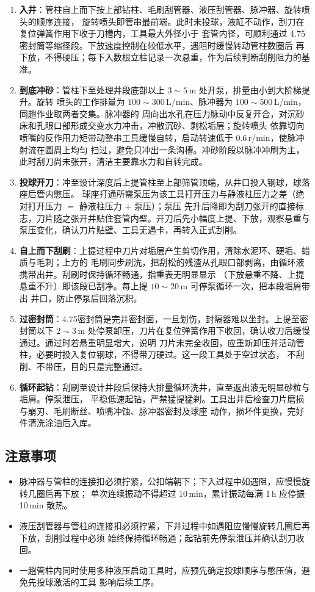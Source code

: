 \begin{enumerate}[label=(\arabic*),leftmargin=2em,itemsep=2pt]
	\item \textbf{入井}：管柱自上而下按上部钻柱、毛刷刮管器、液压刮管器、脉冲器、旋转喷头的顺序连接，
	旋转喷头即管串最前端。此时未投球，液缸不动作，刮刀在复位弹簧作用下收于刀槽内，工具最大外径小于
	套管内径，可顺利通过 4.75\inch 密封筒等缩径段。下放速度控制在较低水平，遇阻时缓慢转动管柱数圈后
	再下放，不得硬压；每下入数根立柱记录一次悬重，作为后续判断刮削阻力的基准。
	\item \textbf{到底冲砂}：管柱下至处理井段底部以上 $3\sim5$\,m 处开泵，排量由小到大阶梯提升。旋转
	喷头的工作排量为 $100\sim300$\,L/min、脉冲器为 $100\sim500$\,L/min，同趟作业取两者交集。脉冲器的
	周向出水孔在压力脉动中反复开合，对沉砂床和孔眼口部形成交变水力冲击，冲散沉砂、剥松垢层；旋转喷头
	依靠切向喷嘴的反作用力矩带动整串工具缓慢自转，启动转速低于 0.6\,r/min，使脉冲射流在圆周上均匀
	扫过，避免只冲出一条沟槽。冲砂阶段以脉冲冲刷为主，此时刮刀尚未张开，清洁主要靠水力和自转完成。
	\item \textbf{投球开刀}：冲至设计深度后上提管柱至上部筛管顶端，从井口投入钢球，球落座后管内憋压。
	球座打通所需泵压为该工具打开压力与静液柱压力之差（绝对打开压力 $=$ 静液柱压力 $+$ 泵压）；泵压
	先升后降即为刮刀张开的直接标志，刀片随之张开并贴住套管内壁。开刀后先小幅度上提、下放，观察悬重与
	泵压变化，确认刀片贴壁、工具无遇卡，再转入正式刮削。
	\item \textbf{自上而下刮刷}：上提过程中刀片对垢层产生剪切作用，清除水泥环、硬垢、蜡质与毛刺；上方的
	毛刷同步刷洗，把刮松的残渣从孔眼口部剥离，由循环液携带出井。刮刷时保持循环畅通，指重表无明显显示
	（下放悬重不降、上提悬重不升）即该段已刮净。每上提 $10\sim20$\,m 可停泵循环一次，把本段垢屑带出
	井口，防止停泵后回落沉积。
	\item \textbf{过密封筒}：4.75\inch 密封筒是完井密封面，一旦划伤，封隔器难以坐封。上提至密封筒以下
	$2\sim3$\,m 处停泵卸压，刀片在复位弹簧作用下收回，确认收刀后缓慢通过。通过时若悬重明显增大，说明
	刀片未完全收回，应重新卸压并活动管柱，必要时投入复位钢球，不得带刀硬过。这一段工具处于空过状态，
	不刮削、不带压，目的只是完整通过。
	\item \textbf{循环起钻}：刮刷至设计井段后保持大排量循环洗井，直至返出液无明显砂粒与垢屑。停泵泄压，
	平稳低速起钻，严禁猛提猛刹。工具出井后检查刀片磨损与崩刃、毛刷断丝、喷嘴冲蚀、脉冲器密封及球座
	动作，损坏件更换，完好件清洗涂油后入库。
\end{enumerate}

\subsection{注意事项}

\begin{itemize}
	\item 脉冲器与管柱的连接扣必须拧紧，公扣端朝下；下入过程中如遇阻，应慢慢旋转几圈后再下放；
	单次连续振动不得超过 10\,min，累计振动每满 1\,h 应停振 10\,min 散热。
	\item 液压刮管器与管柱的连接扣必须拧紧，下井过程中如遇阻应慢慢旋转几圈后再下放，刮削过程中必须
	始终保持循环畅通；起钻前先停泵泄压并确认刮刀收回。
	\item 一趟管柱内同时使用多种液压启动工具时，应预先确定投球顺序与憋压值，避免先投球激活的工具
	影响后续工序。
\end{itemize}

